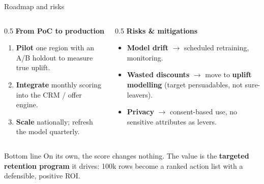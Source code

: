 \documentclass[aspectratio=169]{beamer}
\begin{document}
\begin{frame}{Roadmap and risks}
    \begin{columns}[T]
    \begin{column}{0.5\textwidth}
        \textbf{From PoC to production}
        \begin{enumerate}\footnotesize
            \item \textbf{Pilot} one region with an A/B holdout to measure true
                  uplift.
            \item \textbf{Integrate} monthly scoring into the CRM / offer engine.
            \item \textbf{Scale} nationally; refresh the model quarterly.
        \end{enumerate}
        \vspace{0.8em}
        \centering
    \end{column}
    \begin{column}{0.5\textwidth}
        \textbf{Risks \& mitigations}
        \begin{itemize}\footnotesize
            \item \textbf{Model drift} $\rightarrow$ scheduled retraining,
                  monitoring.
            \item \textbf{Wasted discounts} $\rightarrow$ move to
                  \textbf{uplift modelling} (target persuadables, not
                  sure-leavers).
            \item \textbf{Privacy} $\rightarrow$ consent-based use, no sensitive
                  attributes as levers.
        \end{itemize}
    \end{column}
    \end{columns}
    \vspace{0.4em}
    \begin{block}{Bottom line}
        On its own, the score changes nothing. The value is the \textbf{targeted
        retention program} it drives: 100k rows become a ranked action list
        with a defensible, positive ROI.
    \end{block}
\end{frame}
\end{document}
